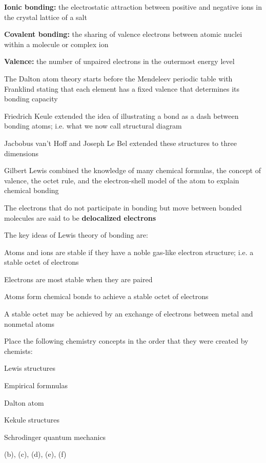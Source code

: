 \begin{bulleted-list}
    \item \textbf{Ionic bonding:} the electrostatic attraction between positive and negative ions
        in the crystal lattice of a salt
    \item \textbf{Covalent bonding:} the sharing of valence electrons between atomic nuclei
        within a molecule or complex ion
    \item \textbf{Valence:} the number of unpaired electrons in the outermost energy level
    \item The Dalton atom theory starts before the Mendeleev periodic table with Franklind stating
        that each element has a fixed valence that determines its bonding capacity
    \item Friedrich Keule extended the idea of illustrating a bond as a dash between bonding atoms;
        i.e. what we now call structural diagram
    \item Jacbobus van't Hoff and Joseph Le Bel extended these structures to three dimensions
    \item Gilbert Lewis combined the knowledge of many chemical formulas, the concept of valence,
        the octet rule, and the electron-shell model of the atom to explain chemical bonding
    \item The electrons that do not participate in bonding but move between bonded molecules are
        said to be \textbf{delocalized electrons}
\end{bulleted-list}

\begin{important}
    The key ideas of Lewis theory of bonding are:
    \begin{bulleted-list}
        \item Atoms and ions are stable if they have a noble gas-like electron structure; i.e.
            a stable octet of electrons
        \item Electrons are most stable when they are paired
        \item Atoms form chemical bonds to achieve a stable octet of electrons
        \item A stable octet may be achieved by an exchange of electrons between metal and nonmetal
            atoms
    \end{bulleted-list}
\end{important}

\begin{sample}{Place the following chemistry concepts in the order that they were created by
    chemists:
    \begin{enum-alph}
        \item Lewis structures
        \item Empirical formnulas
        \item Dalton atom
        \item Kekule structures
        \item Schrodinger quantum mechanics
    \end{enum-alph}
}
    (b), (c), (d), (e), (f)
\end{sample}

